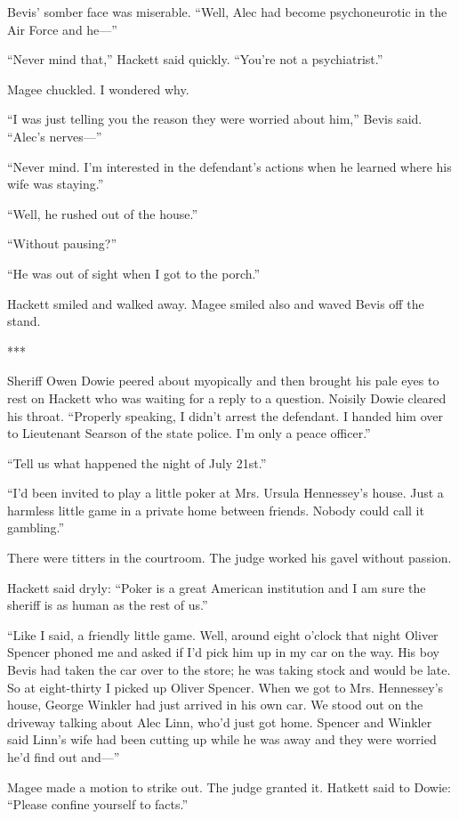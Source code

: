 {Bevis’ somber face was miserable. “Well, Alec had become psychoneurotic in the Air Force and he—”

“Never mind that,” Hackett said quickly. “You’re not a psychiatrist.”

Magee chuckled. I wondered why.

“I was just telling you the reason they were worried about him,” Bevis said. “Alec’s nerves—”

“Never mind. I’m interested in the defendant’s actions when he learned where his wife was staying.”

“Well, he rushed out of the house.”

“Without pausing?”

“He was out of sight when I got to the porch.”

Hackett smiled and walked away. Magee smiled also and waved Bevis off the stand.

***

Sheriff Owen Dowie peered about myopically and then brought his pale eyes to rest on Hackett who was waiting for a reply to a question. Noisily Dowie cleared his throat. “Properly speaking, I didn’t arrest the defendant. I handed him over to Lieutenant Searson of the state police. I’m only a peace officer.”

“Tell us what happened the night of July 21st.”

“I’d been invited to play a little poker at Mrs. Ursula Hennessey’s house. Just a harmless little game in a private home between friends. Nobody could call it gambling.”

There were titters in the courtroom. The judge worked his gavel without passion.

Hackett said dryly: “Poker is a great American institution and I am sure the sheriff is as human as the rest of us.”

“Like I said, a friendly little game. Well, around eight o’clock that night Oliver Spencer phoned me and asked if I’d pick him up in my car on the way. His boy Bevis had taken the car over to the store; he was taking stock and would be late. So at eight-thirty I picked up Oliver Spencer. When we got to Mrs. Hennessey’s house, George Winkler had just arrived in his own car. We stood out on the driveway talking about Alec Linn, who’d just got home. Spencer and Winkler said Linn’s wife had been cutting up while he was away and they were worried he’d find out and—”

Magee made a motion to strike out. The judge granted it. Hatkett said to Dowie: “Please confine yourself to facts.”

}
